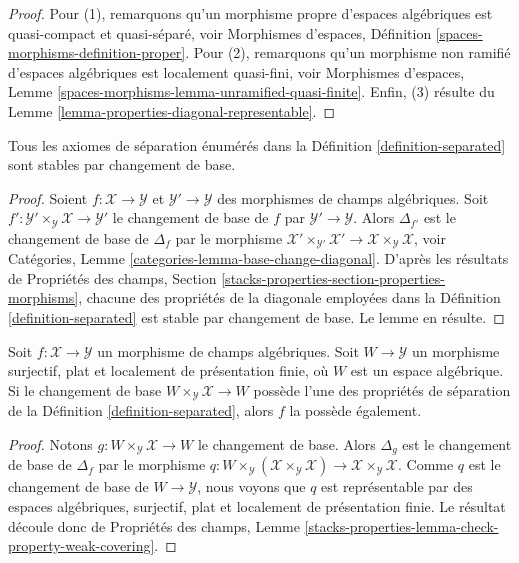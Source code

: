 \begin{proof}
Pour (1), remarquons qu'un morphisme propre d'espaces algébriques est
quasi-compact et quasi-séparé, voir Morphismes d'espaces, Définition
\ref{spaces-morphisms-definition-proper}. Pour (2), remarquons qu'un
morphisme non ramifié d'espaces algébriques est localement quasi-fini, voir
Morphismes d'espaces, Lemme
\ref{spaces-morphisms-lemma-unramified-quasi-finite}.
Enfin, (3) résulte du Lemme \ref{lemma-properties-diagonal-representable}.
\end{proof}

\begin{lemma}
\label{lemma-base-change-separated}
Tous les axiomes de séparation énumérés dans la Définition
\ref{definition-separated} sont stables par changement de base.
\end{lemma}

\begin{proof}
Soient $f : \mathcal{X} \to \mathcal{Y}$ et
$\mathcal{Y}' \to \mathcal{Y}$ des morphismes de champs algébriques.
Soit $f' : \mathcal{Y}' \times_\mathcal{Y} \mathcal{X} \to \mathcal{Y}'$
le changement de base de $f$ par $\mathcal{Y}' \to \mathcal{Y}$.
Alors $\Delta_{f'}$ est le changement de base de $\Delta_f$ par le morphisme
$\mathcal{X}' \times_{\mathcal{Y}'} \mathcal{X}' \to
\mathcal{X} \times_\mathcal{Y} \mathcal{X}$, voir Catégories, Lemme
\ref{categories-lemma-base-change-diagonal}. D'après les résultats de
Propriétés des champs,
Section \ref{stacks-properties-section-properties-morphisms}, chacune des
propriétés de la diagonale employées dans la Définition
\ref{definition-separated} est stable par changement de base. Le lemme en
résulte.
\end{proof}

\begin{lemma}
\label{lemma-check-separated-covering}
Soit $f : \mathcal{X} \to \mathcal{Y}$ un morphisme de champs algébriques.
Soit $W \to \mathcal{Y}$ un morphisme surjectif, plat et localement de
présentation finie, où $W$ est un espace algébrique. Si le changement de base
$W \times_\mathcal{Y} \mathcal{X} \to W$ possède l'une des propriétés de
séparation de la Définition \ref{definition-separated}, alors $f$ la possède
également.
\end{lemma}

\begin{proof}
Notons $g : W \times_\mathcal{Y} \mathcal{X} \to W$ le changement de base.
Alors $\Delta_g$ est le changement de base de $\Delta_f$ par le morphisme
$q : W \times_\mathcal{Y} (\mathcal{X} \times_\mathcal{Y} \mathcal{X})
\to \mathcal{X} \times_\mathcal{Y} \mathcal{X}$. Comme $q$ est le changement
de base de $W \to \mathcal{Y}$, nous voyons que $q$ est représentable par des espaces
algébriques, surjectif, plat et localement de présentation finie. Le résultat
découle donc de Propriétés des champs, Lemme
\ref{stacks-properties-lemma-check-property-weak-covering}.
\end{proof}

